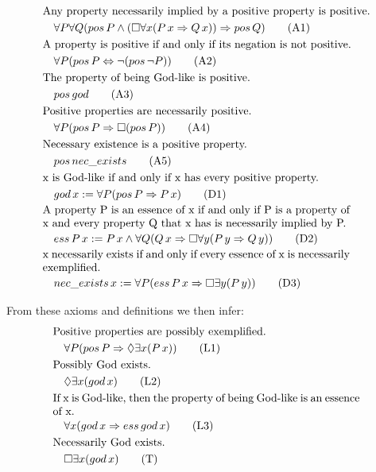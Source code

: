 \documentclass{llncs}
\begin{document}
\begin{align}
& \text{Any property necessarily implied by a positive property is positive.} \notag \\
& \quad \forall P \forall Q (pos\,P \wedge (\Box \forall x (P\,x \Rightarrow Q\,x)) \Rightarrow pos\,Q) \tag{A1} \\
& \text{A property is positive if and only if its negation is not positive.} \notag \\
& \quad \forall P (pos\,P \Leftrightarrow \neg (pos\,\neg P)) \tag{A2} \\
& \text{The property of being God-like is positive.} \notag \\
& \quad pos\,god \tag{A3} \\
& \text{Positive properties are necessarily positive.} \notag \\
& \quad \forall P (pos\,P \Rightarrow \Box (pos\,P))\tag{A4} \\
& \text{Necessary existence is a positive property.} \notag \\
& \quad pos\,nec\_exists \tag{A5} \\
& \text{x is God-like if and only if x has every positive property.} \notag \\
& \quad god\,x := \forall P (pos\,P \Rightarrow P\,x) \tag{D1} \\ 
& \parbox[c][2em][c]{0.8\textwidth}{A property P is an essence of x if and only if P is a property of x and every property Q that x has is necessarily implied by P.}\notag \\
& \quad ess\,P\,x := P\,x \wedge \forall Q (Q\,x \Rightarrow \Box \forall y (P\,y \Rightarrow Q\,y)) \tag{D2} \\
& \parbox[c][2em][c]{0.8\textwidth}{x necessarily exists if and only if every essence of x is necessarily exemplified.} \notag \\
& \quad nec\_exists\,x := \forall P (ess\,P\,x \Rightarrow \Box \exists y (P\,y)) \tag{D3} 
\end{align}

\noindent
From these axioms and definitions we then infer:
\begin{align}
& \text{Positive properties are possibly exemplified.} \notag \\
& \quad \forall P (pos\,P \Rightarrow \Diamond \exists x (P\,x)) \tag{L1} \\
& \text{Possibly God exists.} \notag \\
& \quad \Diamond \exists x (god\,x) \tag{L2} \\
& \parbox[c][2em][c]{0.8\textwidth}{If x is God-like, then the property of being God-like is an essence of x.} \notag \\
& \quad \forall x (god\,x \Rightarrow ess\,god\,x) \tag{L3} \\
& \text{Necessarily God exists.} \notag \\
& \quad \Box \exists x (god\,x) \tag{T}
\end{align}
\end{document}
